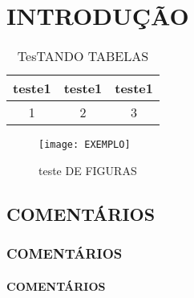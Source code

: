 \documentclass[
        12pt,                           %
        openright,                      %
        twoside,                        %
        a4paper,                        %
        chapter=TITLE,          %
        section=TITLE,          %
        subsection=Title,      %
        english,                        %
        portugues,                         %
        sumario=tradicional             %
        ]{abntex2}
\begin{document}
\renewcommand{\bibname}{\uppercase{REFER\^ENCIAS}}

\renewcommand{\tablename}{TABELA }
\renewcommand{\figurename}{FIGURA }



\textual
\pagestyle{textualUFPR}

\chapter[INTRODUÇÃO]{INTRODUÇÃO}



\begin{table}[!ht]
 \begin{tabular}{c|c|c}
 teste1&teste1&teste1\\\hline\hline
  1&2&3\\\hline
 \end{tabular}

 \par\caption{TesTANDO TABELAS}
 \label{tab:tab01}
\end{table}

\begin{figure}[!ht]
 \centering
 \texttt{[image: EXEMPLO]}
 
 \caption{teste DE FIGURAS}
 \label{fig:01}
\end{figure}


\section{COMENTÁRIOS}
\subsection{COMENTÁRIOS}
\subsubsection{COMENTÁRIOS}
%
\end{document}
